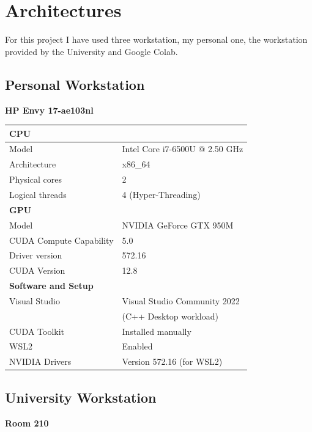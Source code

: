 \section{Architectures}
For this project I have used three workstation, my personal one, the workstation provided by the University and Google Colab.

\subsection{Personal Workstation}
\textbf{HP Envy 17-ae103nl}

\begin{table}[h!]
\renewcommand{\arraystretch}{1.2}
\begin{tabularx}{\textwidth}{lX}
\multicolumn{2}{l}{\textbf{CPU}} \\ \hline
Model & Intel Core i7-6500U @ 2.50 GHz \\
Architecture & x86\_64 \\
Physical cores & 2 \\
Logical threads & 4 (Hyper-Threading) \\[6pt]

\multicolumn{2}{l}{\textbf{GPU}} \\ \hline
Model & NVIDIA GeForce GTX 950M \\
CUDA Compute Capability & 5.0 \\
Driver version & 572.16 \\
CUDA Version & 12.8 \\[6pt]

\multicolumn{2}{l}{\textbf{Software and Setup}} \\ \hline
Visual Studio & Visual Studio Community 2022  \\
                & (C++ Desktop workload) \\ 
CUDA Toolkit & Installed manually \\
WSL2 & Enabled \\
NVIDIA Drivers & Version 572.16 (for WSL2) \\
\end{tabularx}
\end{table}


\subsection{University Workstation}
\textbf{Room 210}

